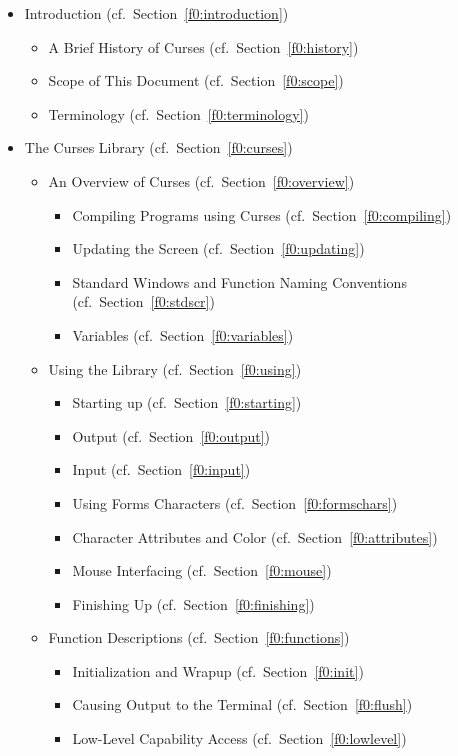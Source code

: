 \begin{itemize}\item Introduction (cf.\ Section~\ref{f0:introduction})
\begin{itemize}
\item A Brief History of Curses (cf.\ Section~\ref{f0:history})
\item Scope of This Document (cf.\ Section~\ref{f0:scope})
\item Terminology (cf.\ Section~\ref{f0:terminology})
\end{itemize}
\item The Curses Library (cf.\ Section~\ref{f0:curses})
\begin{itemize}
\item An Overview of Curses (cf.\ Section~\ref{f0:overview})
\begin{itemize}
\item Compiling Programs using Curses (cf.\ Section~\ref{f0:compiling})
\item Updating the Screen (cf.\ Section~\ref{f0:updating})
\item Standard Windows and Function Naming Conventions (cf.\ Section~\ref{f0:stdscr})
\item Variables (cf.\ Section~\ref{f0:variables})
\end{itemize}
\item Using the Library (cf.\ Section~\ref{f0:using})
\begin{itemize}
\item Starting up (cf.\ Section~\ref{f0:starting})
\item Output (cf.\ Section~\ref{f0:output})
\item Input (cf.\ Section~\ref{f0:input})
\item Using Forms Characters (cf.\ Section~\ref{f0:formschars})
\item Character Attributes and Color (cf.\ Section~\ref{f0:attributes})
\item Mouse Interfacing (cf.\ Section~\ref{f0:mouse})
\item Finishing Up (cf.\ Section~\ref{f0:finishing})
\end{itemize}
\item Function Descriptions (cf.\ Section~\ref{f0:functions})
\begin{itemize}
\item Initialization and Wrapup (cf.\ Section~\ref{f0:init})
\item Causing Output to the Terminal (cf.\ Section~\ref{f0:flush})
\item Low-Level Capability Access (cf.\ Section~\ref{f0:lowlevel})

\end{itemize}
\end{itemize}
\end{itemize}
